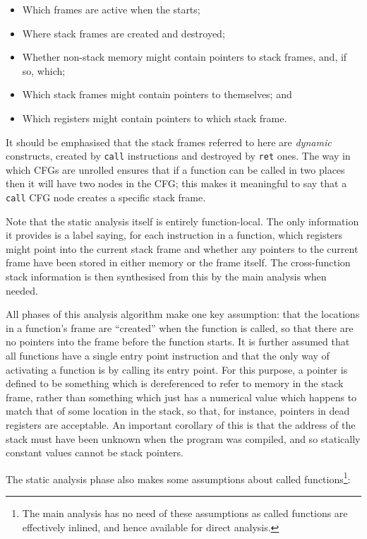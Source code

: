 \begin{itemize}
\item
  Which frames are active when the {\StateMachine} starts;
\item
  Where stack frames are created and destroyed;
\item
  Whether non-stack memory might contain pointers to stack frames,
  and, if so, which;
\item
  Which stack frames might contain pointers to themselves; and
\item
  Which registers might contain pointers to which stack frame.
\end{itemize}

It should be emphasised that the stack frames referred to here are
\emph{dynamic} constructs, created by \verb|call| instructions and
destroyed by \verb|ret| ones.  The way in which CFGs are unrolled
ensures that if a function can be called in two places then it will
have two nodes in the CFG; this makes it meaningful to say that a
\verb|call| CFG node creates a specific stack frame.

Note that the static analysis itself is entirely function-local.  The
only information it provides is a label saying, for each instruction
in a function, which registers might point into the current stack
frame and whether any pointers to the current frame have been stored
in either memory or the frame itself.  The cross-function stack
information is then synthesised from this by the main analysis when
needed.

\label{sect:function_head}
All phases of this analysis algorithm make one key assumption: that
the locations in a function's frame are ``created'' when the function
is called, so that there are no pointers into the frame before the
function starts.  It is further assumed that all functions have a
single entry point instruction and that the only way of activating a
function is by calling its entry point.  For this purpose, a pointer
is defined to be something which is dereferenced to refer to memory in
the stack frame, rather than something which just has a numerical
value which happens to match that of some location in the stack, so
that, for instance, pointers in dead registers are acceptable.  An
important corollary of this is that the address of the stack must have
been unknown when the program was compiled, and so statically constant
values cannot be stack pointers.

The static analysis phase also makes some assumptions about called
functions\footnote{The main analysis has no need of these assumptions
  as called functions are effectively inlined, and hence available for
  direct analysis.}:

